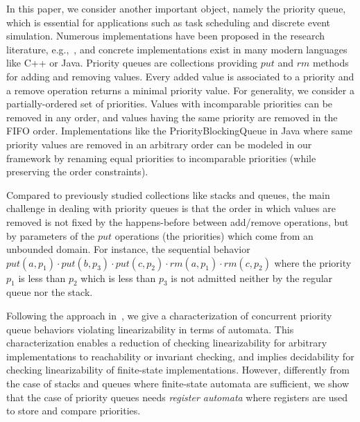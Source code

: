 In this paper, we consider another important object, namely the priority queue, which is essential for applications such as task scheduling and discrete event simulation. Numerous implementations have been proposed in the research literature, e.g.,~\cite{DBLP:conf/ppopp/AlistarhKLS15,DBLP:conf/wdag/CalciuMH14,DBLP:conf/opodis/LindenJ13,DBLP:conf/podc/ShavitZ99,DBLP:conf/ipps/ShavitL00}, and concrete implementations exist in many modern languages like C++ or Java.  
%
%
Priority queues are collections providing $\textit{put}$ and $\textit{rm}$ methods for adding and removing values. Every added value is associated to a priority and a remove operation returns a minimal priority value. For generality, we consider a partially-ordered set of priorities. Values with incomparable priorities can be removed in any order, and values having the same priority are removed in the FIFO order. Implementations like the PriorityBlockingQueue in Java where same priority values are removed in an arbitrary order can be modeled in our framework by renaming equal priorities to incomparable priorities (while preserving the order constraints).

Compared to previously studied collections like stacks and queues, the main challenge in dealing with priority queues is that the order in which values are removed is not fixed by the happens-before between add/remove operations, but by parameters of the $\textit{put}$ operations (the priorities) which come from an unbounded domain. For instance, the sequential behavior $\textit{put}(a,p_1)\cdot \textit{put}(b,p_3)\cdot \textit{put}(c,p_2)\cdot \textit{rm}(a,p_1)\cdot \textit{rm}(c,p_2)$ where the priority $p_1$ is less than $p_2$ which is less than $p_3$ is not admitted neither by the regular queue nor the stack. 



Following the approach in~\cite{DBLP:conf/icalp/BouajjaniEEH15}, we give a characterization of concurrent priority queue behaviors violating linearizability in terms of automata. This characterization enables a reduction of checking linearizability for arbitrary implementations to reachability or invariant checking, and implies decidability for checking linearizability of finite-state implementations. However, differently from the case of stacks and queues where finite-state automata are sufficient, we show that the case of priority queues needs \emph{register automata} where registers are used to store and compare priorities.

